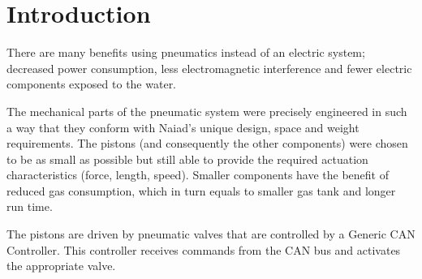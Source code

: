 \section{Introduction}\label{sec:introduction}
There are many benefits using pneumatics instead of an electric  system; decreased power consumption, less electromagnetic interference and fewer electric components exposed to the water.

The mechanical parts of the pneumatic system were precisely engineered in such a way that they conform with Naiad's unique design, space and weight requirements. The pistons (and consequently the other components) were chosen to be as small as possible but still able to provide the required actuation characteristics (force, length, speed). Smaller components have the benefit of reduced gas consumption, which in turn equals to smaller gas tank and longer run time.

The pistons are driven by pneumatic valves that are controlled by a Generic CAN Controller. This controller receives commands from the CAN bus and activates the appropriate valve.
